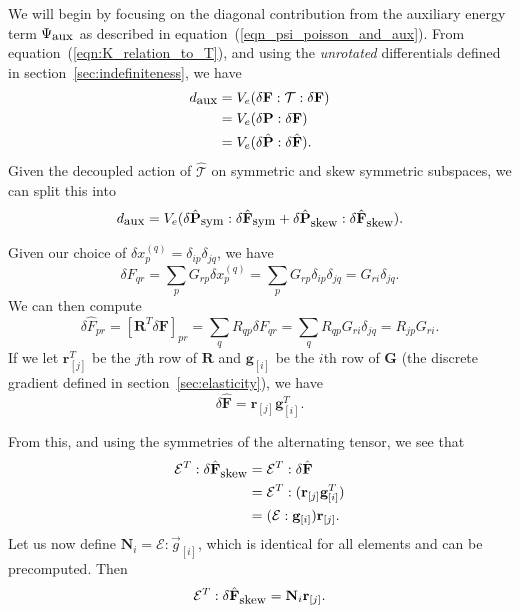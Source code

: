 We will begin by focusing on the diagonal contribution from the
auxiliary energy term $\Psi_{\mbox{\small aux}}$ as described in
equation~(\ref{eqn_psi_poisson_and_aux}). From
equation~(\ref{eqn:K_relation_to_T}), and using the \emph{unrotated}
differentials defined in section~\ref{sec:indefiniteness}, we have 
\begin{align*}
d_{\mbox{\small aux}} &= V_e(\delta\mathbf{F}:\mathcal{T}:\delta\mathbf{F})\\
  &=V_e(\delta\mathbf{P}:\delta\mathbf{F})\\
  &=V_e(\delta\hat{\mathbf{P}}:\delta\hat{\mathbf{F}}).
\end{align*}
Given the decoupled action of $\hat{\mathcal{T}}$ on symmetric and
skew symmetric subspaces, we can split this into 
\begin{equation}\label{eqn:diagonal_sym_skew}
d_{\mbox{\small aux}}=V_e(\delta\hat{\mathbf{P}}_{\mbox{\small sym}}:\delta\hat{\mathbf{F}}_{\mbox{\small sym}} +
\delta\hat{\mathbf{P}}_{\mbox{\small skew}}:\delta\hat{\mathbf{F}}_{\mbox{\small skew}}).
\end{equation}

Given our choice of $\delta x
^{(q)}_p = \delta_{ip}\delta_{jq}$, we have
\begin{equation*}
\delta F_{qr} = \sum_pG_{rp}\delta x^{(q)}_{p} =
\sum_pG_{rp}\delta_{ip}\delta_{jq}=G_{ri}\delta_{jq}.
\end{equation*}
We can then compute 
\begin{equation*}
\delta\hat{F}_{pr} = [\mathbf{R}^T\delta\mathbf{F}]_{pr} =
\sum_qR_{qp}\delta F_{qr} = \sum_qR_{qp}G_{ri}\delta_{jq} =
R_{jp}G_{ri}.
\end{equation*}
If we let $\mathbf{r}_{[j]}^T$ be the $j$th row of $\mathbf{R}$ and
$\mathbf{g}_{[i]}$ be the $i$th row of $\mathbf{G}$ (the discrete
gradient defined in section~\ref{sec:elasticity}), we have
\begin{equation}\label{eqn:dF_diagonal}
\delta\hat{\mathbf{F}} = \mathbf{r}_{[j]}\mathbf{g}_{[i]}^T.
\end{equation}

From this, and using the symmetries of the alternating tensor, we see that
\begin{align*}
\mathcal{E}^T:\delta\hat{\mathbf{F}}_{\mbox{\small skew}}
&=\mathcal{E}^T:\delta\hat{\mathbf{F}}\\
&=\mathcal{E}^T:(\mathbf{r}_{[j]}\mathbf{g}^T_{[i]})\\
&=(\mathcal{E}:\mathbf{g}_{[i]})\mathbf{r}_{[j]}.
\end{align*}
Let us now define
$\mathbf{N}_i=\mathcal{E}:\vec{g}_{[i]}$, which is identical for all
elements and can be precomputed. Then 
\begin{equation}\label{eqn:N_diagonal}
\mathcal{E}^T:\delta\hat{\mathbf{F}}_{\mbox{\small skew}} =
\mathbf{N}_i\mathbf{r}_{[j]}.
\end{equation}

